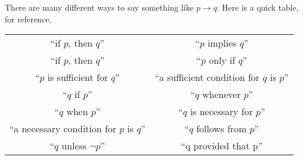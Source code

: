 \documentclass[../notes.tex]{subfiles}
\begin{document}
There are many different ways to say something like $p\to q$. Here is a quick table, for reference.
\begin{center}
    \begin{tabular}{ c|c } 
    ``if $p$, then $q$'' & ``$p$ implies $q$'' \\
    ``if $p$, then $q$'' & ``$p$ only if $q$'' \\
    ``$p$ is sufficient for $q$'' & ``a sufficient condition for $q$ is $p$'' \\
    ``$q$ if $p$'' & ``$q$ whenever $p$'' \\
    ``$q$ when $p$'' &  ``$q$ is necessary for $p$'' \\
    ``a necessary condition for $p$ is $q$'' & “$q$ follows from $p$'' \\
    ``$q$ unless $\lnot p$'' & ``q provided that p''
    \end{tabular}
\end{center}
\end{document}
